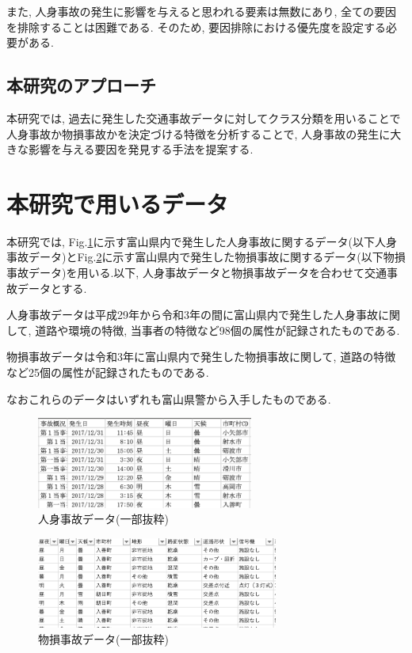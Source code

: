 \documentclass[a4j,8.5pt, twocolumn,fleqn]{jbook}
\begin{document}
また, 人身事故の発生に影響を与えると思われる要素は無数にあり, 全ての要因を排除することは困難である. 
そのため, 要因排除における優先度を設定する必要がある. 

\subsection{本研究のアプローチ}
本研究では, 過去に発生した交通事故データに対してクラス分類を用いることで人身事故か物損事故かを決定づける特徴を分析することで, 人身事故の発生に大きな影響を与える要因を発見する手法を提案する. 



\section{本研究で用いるデータ}
本研究では, Fig.\ref{人身事故データ}に示す富山県内で発生した人身事故に関するデータ(以下人身事故データ)とFig.\ref{物損事故データ}に示す富山県内で発生した物損事故に関するデータ(以下物損事故データ)を用いる.以下, 人身事故データと物損事故データを合わせて交通事故データとする. 

人身事故データは平成29年から令和3年の間に富山県内で発生した人身事故に関して, 道路や環境の特徴, 当事者の特徴など98個の属性が記録されたものである. 

物損事故データは令和3年に富山県内で発生した物損事故に関して, 道路の特徴など25個の属性が記録されたものである. 

なおこれらのデータはいずれも富山県警から入手したものである. 

\begin{figure}[htb]
    \centering
    \includegraphics[height=30mm]{images/jinshixn.png}
    \vspace{-4mm}
    \caption{人身事故データ(一部抜粋)}
    \label{人身事故データ}
\end{figure}

\begin{figure}[htb]
    \centering
    \includegraphics[height=30mm]{images/bussoxn.png}
    \vspace{-4mm}
    \caption{物損事故データ(一部抜粋)}
    \label{物損事故データ}
\end{figure}
\end{document}
